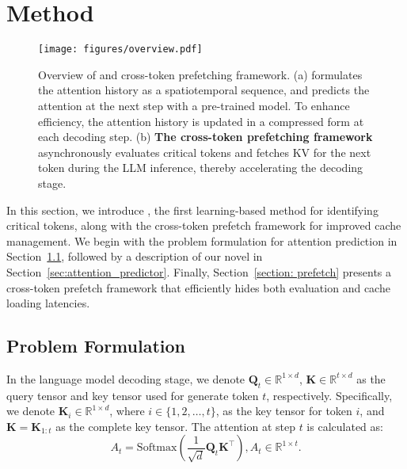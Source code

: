 \section{Method} \label{section: method}

\begin{figure*}[t]
    \centering
    \texttt{[image: figures/overview.pdf]}
    \caption{Overview of \ours and cross-token prefetching framework. (a) \textbf{\ours}  formulates the attention history as a spatiotemporal sequence, and predicts the attention at the next step with a pre-trained model. To enhance efficiency, the attention history is updated in a compressed form at each decoding step. (b) \textbf{The cross-token prefetching framework} asynchronously evaluates critical tokens and fetches KV for the next token during the LLM inference, thereby accelerating the decoding stage.}
    \label{fig:prefetch_overview}  
\end{figure*}


In this section, we introduce \ours, the first learning-based method for identifying critical tokens, along with the cross-token prefetch framework for improved cache management. We begin with the problem formulation for attention prediction in Section~\ref{section:formulation}, followed by a description of our novel \ours in Section~\ref{sec:attention_predictor}. Finally, Section~\ref{section: prefetch} presents a cross-token prefetch framework that efficiently hides both evaluation and cache loading latencies.

\subsection{Problem Formulation}
\label{section:formulation}

In the language model decoding stage, we denote $\mathbf{Q}_t \in \mathbb{R}^{1 \times d}$, $\mathbf{K} \in \mathbb{R}^{t \times d}$ as the query tensor and key tensor used for generate token $t$, respectively. Specifically, we denote \( \mathbf{K}_i \in \mathbb{R}^{1 \times d} \), where \( i \in \{1, 2, \dots, t\} \), as the key tensor for token \( i \), and \( \mathbf{K} = \mathbf{K}_{1:t} \) as the complete key tensor. The attention at step $t$ is calculated as:
\begin{equation}
    A_t=\text{Softmax}\left(\frac{1}{\sqrt{d}} \mathbf{Q}_t \mathbf{K}^\top \right), A_t \in \mathbb{R}^{1 \times t}. 
\end{equation}


